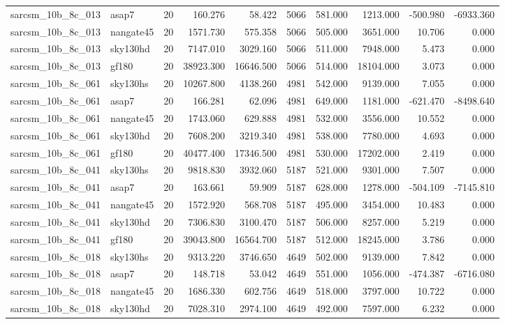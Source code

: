 \begin{longtable}{llrrrrrrrr}
sarcsm\_10b\_8c\_013 & asap7 & 20 & 160.276 & 58.422 & 5066 & 581.000 & 1213.000 & -500.980 & -6933.360 \\
sarcsm\_10b\_8c\_013 & nangate45 & 20 & 1571.730 & 575.358 & 5066 & 505.000 & 3651.000 & 10.706 & 0.000 \\
sarcsm\_10b\_8c\_013 & sky130hd & 20 & 7147.010 & 3029.160 & 5066 & 511.000 & 7948.000 & 5.473 & 0.000 \\
sarcsm\_10b\_8c\_013 & gf180 & 20 & 38923.300 & 16646.500 & 5066 & 514.000 & 18104.000 & 3.073 & 0.000 \\
sarcsm\_10b\_8c\_061 & sky130hs & 20 & 10267.800 & 4138.260 & 4981 & 542.000 & 9139.000 & 7.055 & 0.000 \\
sarcsm\_10b\_8c\_061 & asap7 & 20 & 166.281 & 62.096 & 4981 & 649.000 & 1181.000 & -621.470 & -8498.640 \\
sarcsm\_10b\_8c\_061 & nangate45 & 20 & 1743.060 & 629.888 & 4981 & 532.000 & 3556.000 & 10.552 & 0.000 \\
sarcsm\_10b\_8c\_061 & sky130hd & 20 & 7608.200 & 3219.340 & 4981 & 538.000 & 7780.000 & 4.693 & 0.000 \\
sarcsm\_10b\_8c\_061 & gf180 & 20 & 40477.400 & 17346.500 & 4981 & 530.000 & 17202.000 & 2.419 & 0.000 \\
sarcsm\_10b\_8c\_041 & sky130hs & 20 & 9818.830 & 3932.060 & 5187 & 521.000 & 9301.000 & 7.507 & 0.000 \\
sarcsm\_10b\_8c\_041 & asap7 & 20 & 163.661 & 59.909 & 5187 & 628.000 & 1278.000 & -504.109 & -7145.810 \\
sarcsm\_10b\_8c\_041 & nangate45 & 20 & 1572.920 & 568.708 & 5187 & 495.000 & 3454.000 & 10.483 & 0.000 \\
sarcsm\_10b\_8c\_041 & sky130hd & 20 & 7306.830 & 3100.470 & 5187 & 506.000 & 8257.000 & 5.219 & 0.000 \\
sarcsm\_10b\_8c\_041 & gf180 & 20 & 39043.800 & 16564.700 & 5187 & 512.000 & 18245.000 & 3.786 & 0.000 \\
sarcsm\_10b\_8c\_018 & sky130hs & 20 & 9313.220 & 3746.650 & 4649 & 502.000 & 9139.000 & 7.842 & 0.000 \\
sarcsm\_10b\_8c\_018 & asap7 & 20 & 148.718 & 53.042 & 4649 & 551.000 & 1056.000 & -474.387 & -6716.080 \\
sarcsm\_10b\_8c\_018 & nangate45 & 20 & 1686.330 & 602.756 & 4649 & 518.000 & 3797.000 & 10.722 & 0.000 \\
sarcsm\_10b\_8c\_018 & sky130hd & 20 & 7028.310 & 2974.100 & 4649 & 492.000 & 7597.000 & 6.232 & 0.000 \\

\end{longtable}
